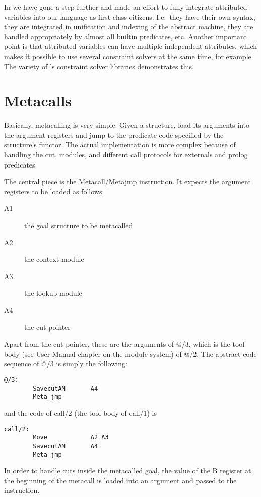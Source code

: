 In {\eclipse} we have gone a step further and made an effort to fully
integrate attributed variables into our language as first class citizens.
I.e.\ they have their own syntax, they are integrated in unification
and indexing of the abstract machine, they are handled appropriately
by almost all builtin predicates, etc. Another important point is that
{\eclipse} attributed variables can have multiple independent
attributes, which makes it possible to use several constraint solvers
at the same time, for example.  The variety of {\eclipse}'s constraint
solver libraries demonstrates this.



\section{Metacalls}
\label{secmetacall}

Basically, metacalling is very simple:  Given a structure, load its
arguments into the argument  registers and jump to the predicate code
specified by the structure's functor.  The actual implementation is
more complex because of handling the cut, modules, and different call
protocols for externals and prolog predicates.

The central piece is the Metacall/Metajmp instruction.
It expects the argument registers to be loaded as follows:
\begin{description}
\item[A1] the goal structure to be metacalled
\item[A2] the context module
\item[A3] the lookup module
\item[A4] the cut pointer
\end{description}
Apart from the cut  pointer, these are the arguments of @/3, which is
the tool body (see User Manual chapter on the module system) of @/2.
The abstract code sequence of @/3 is simply the following:
\begin{verbatim}
@/3:
        SavecutAM       A4
        Meta_jmp
\end{verbatim}
and the code of call/2 (the tool body of call/1) is
\begin{verbatim}
call/2:
        Move            A2 A3
        SavecutAM       A4
        Meta_jmp
\end{verbatim}
In order to handle cuts inside the metacalled goal, the value of the B
register at the beginning of the metacall is loaded into an argument
and passed to the instruction.


